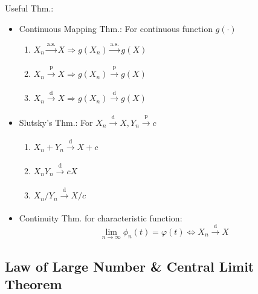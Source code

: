         Useful Thm.:
        \begin{itemize}
            \item Continuous Mapping Thm.: For continuous function $g(\cdot)$\hypertarget{ContinuousMapping}{}
            \begin{enumerate}
                \item $X_n\xrightarrow[]{\text{a.s.}}X\Rightarrow g(X_n)\xrightarrow[]{\text{a.s.}}g(X)$
                \item $X_n\xrightarrow[]{\mathrm{p}}X\Rightarrow g(X_n)\xrightarrow[]{\mathrm{p} }g(X)$
                \item $X_n\xrightarrow[]{\mathrm{d}}X\Rightarrow g(X_n)\xrightarrow[]{\mathrm{d}}g(X)$
            \end{enumerate}
            \item Slutsky's Thm.: For $X_n\xrightarrow[]{\mathrm{d}}X,Y_n\xrightarrow[]{\mathrm{p}}c$
            \begin{enumerate}
                \item $X_n+Y_n\xrightarrow[]{\mathrm{d}}X+c$
                \item $X_nY_n\xrightarrow[]{\mathrm{d}}cX$
                \item $X_n/Y_n\xrightarrow[]{\mathrm{d}}X/c$
            \end{enumerate}
            \item Continuity Thm. for characteristic function:
            \begin{equation}        \lim_{n\to\infty}\phi_n(t)=\varphi(t)\Leftrightarrow X_n\xrightarrow[]{\mathrm{d}}X\end{equation}
        \end{itemize} 


\subsection{Law of Large Number \& Central Limit Theorem}

